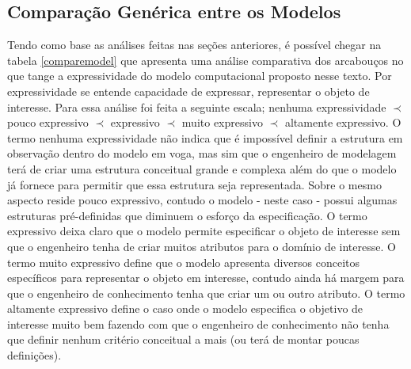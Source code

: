 \subsection{Comparação Genérica entre os Modelos}

Tendo como base as análises feitas nas seções anteriores, é possível chegar na tabela \ref{comparemodel} que apresenta uma análise comparativa dos arcabouços no que tange a expressividade do modelo computacional proposto nesse texto. Por expressividade se entende capacidade de expressar, representar o objeto de interesse. Para essa análise 
foi feita a seguinte escala; nenhuma expressividade $\prec$ pouco expressivo $\prec$ expressivo $\prec$ muito expressivo $\prec$ altamente expressivo. O termo nenhuma expressividade 
não indica que é impossível definir a estrutura em observação dentro do modelo em voga, mas sim que o engenheiro de modelagem terá de criar uma estrutura conceitual grande e complexa 
além do que o modelo já fornece para permitir que essa estrutura seja representada. Sobre o mesmo aspecto reside pouco expressivo, contudo o modelo - neste caso - possui algumas 
estruturas pré-definidas que diminuem o esforço da especificação. O termo expressivo deixa claro que o modelo permite especificar o objeto de interesse sem que o engenheiro 
tenha de criar muitos atributos para o domínio de interesse. O termo muito expressivo define que o modelo apresenta diversos conceitos específicos para representar o objeto em interesse, 
contudo ainda há margem para que o engenheiro de conhecimento tenha que criar um ou outro atributo. O termo altamente expressivo define o caso onde o modelo especifica o objetivo 
de interesse muito bem fazendo com que o engenheiro de conhecimento não tenha que definir nenhum critério conceitual a mais (ou terá de montar poucas definições).   

